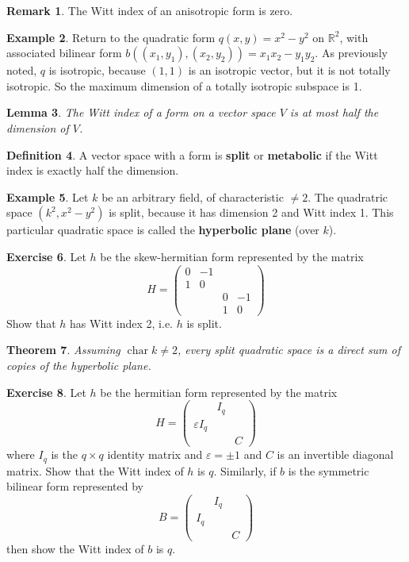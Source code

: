 \documentclass[12pt]{article}
\newtheorem{theorem}{Theorem}
\newtheorem{lemma}[theorem]{Lemma}
\theoremstyle{definition}
\newtheorem{definition}[theorem]{Definition}
\newtheorem{example}[theorem]{Example}
\newtheorem{remark}[theorem]{Remark}
\newtheorem{exercise}[theorem]{Exercise}
\numberwithin{theorem}{subsection}
\newcommand{\R}{\mathbb{R}}
\newcommand{\eps}{\varepsilon}
\newcommand{\tbf}{\textbf}
\DeclareMathOperator{\characteristic}{char}
\begin{document}
\begin{remark}
The Witt index of an anisotropic form is zero.
\end{remark}

\begin{example}
Return to the quadratic form $q(x,y) = x^2 - y^2$ on $\R^2$, with associated bilinear form $b((x_1, y_1), (x_2, y_2)) = x_1 x_2 - y_1 y_2$. As previously noted, $q$ is isotropic, because $(1,1)$ is an isotropic vector, but it is not totally isotropic. So the maximum dimension of a totally isotropic subspace is 1.
\end{example}

\begin{lemma}
The Witt index of a form on a vector space $V$ is at most half the dimension of $V$.
\end{lemma}

\begin{definition}
A vector space with a form is \tbf{split} or \tbf{metabolic} if the Witt index is exactly half the dimension.
\end{definition}

\begin{example}
Let $k$ be an arbitrary field, of characteristic $\neq 2$. The quadratric space $(k^2, x^2 - y^2)$ is split, because it has dimension 2 and Witt index 1. This particular quadratic space is called the \tbf{hyperbolic plane} (over $k$).
\end{example}

\begin{exercise}
Let $h$ be the skew-hermitian form represented by the matrix
\[
	H = 
	\begin{pmatrix}
		0 & -1 \\
		1 & 0 \\
		&& 0 & -1 \\
		&& 1 & 0
	\end{pmatrix}
\]
Show that $h$ has Witt index 2, i.e. $h$ is split.
\end{exercise}

\begin{theorem}
Assuming $\characteristic k \neq 2$, every split quadratic space is a direct sum of copies of the hyperbolic plane.
\end{theorem}

\begin{exercise}
Let $h$ be the hermitian form represented by the matrix
\[
	H =
	\begin{pmatrix}
		& I_q \\
		\eps I_q \\
		&& C
	\end{pmatrix}
\]
where $I_q$ is the $q \times q$ identity matrix and $\eps = \pm 1$ and $C$ is an invertible diagonal matrix. Show that the Witt index of $h$ is $q$. Similarly, if $b$ is the symmetric bilinear form represented by
\[
	B =
	\begin{pmatrix}
		& I_q \\
		I_q \\
		&& C
	\end{pmatrix}
\]
then show the Witt index of $b$ is $q$.
\end{exercise}
\end{document}
